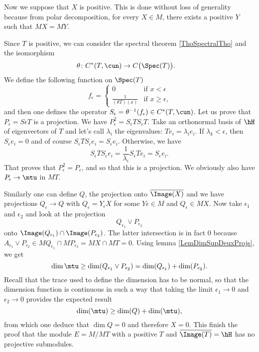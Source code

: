 Now we suppose that $X$ is positive. This is done without loss of generality because from polar decomposition, for every $X\in M$, there exists a positive $Y$ such that $MX=MY$.

Since $T$ is positive, we can consider the spectral theorem \ref{ThoSpectralTho} and the isomorphism
\begin{equation}
\begin{aligned}
 \theta\colon C^*(T,\cun)&\to C\big( \Spec(T) \big). 
\end{aligned}
\end{equation}
We define the following function on $\Spec(T)$
\begin{equation}
	f_{\epsilon}=
			\begin{cases}
					0				&\text{if $x<\epsilon$}\\
					\frac{ 1 }{ (\theta T)(x) }	&\text{if $x\geq\epsilon$,}
			\end{cases}
\end{equation}
and then one defines the operator $S_{\epsilon}=\theta^{-1}(f_{\epsilon})\in C^*(T,\cun)$. Let us prove that $P_{\epsilon}=S\epsilon T$ is a projection. We have $P_{\epsilon}^2=S_{\epsilon} TS_{\epsilon}T$. Take an orthonormal basis of $\hH$ of eigenvectors of $T$ and let's call $\lambda_i$ the eigenvalues: $Te_i=\lambda_ie_i$. If $\lambda_k<\epsilon$, then $S_{\epsilon}e_i=0$ and of course $S_{\epsilon}TS_{\epsilon}e_i=S_{\epsilon}e_i$. Otherwise, we have
\begin{equation}
	S_{\epsilon}TS_{\epsilon}e_i=\frac{1}{ \lambda_i }S_{\epsilon}T e_i =S_{\epsilon}e_i.
\end{equation}
That proves that $P_{\epsilon}^2=P_{\epsilon}$, and so that this is a projection. We obviously also have $P_{\epsilon}\to \mtu$ in $MT$.

Similarly one can define $Q$, the projection onto $\overline{ \Image(X) }$ and we have projections $Q_{\epsilon}\to Q$ with $Q_{\epsilon}=Y_{\epsilon} X$ for some $Y\epsilon\in M$ and $Q_{\epsilon}\in MX$. Now take $\epsilon_1$ and $\epsilon_2$ and look at the projection
\begin{equation}
	Q_{\epsilon_1}\vee P_{\epsilon_2}
\end{equation}
onto $\Image(Q_{\epsilon_1})\cap\Image(P_{\epsilon_2})$. The latter intersection is in fact $0$ because $A_{\epsilon_1}\vee P_{\epsilon_2}\in MQ_{\epsilon_1}\cap MP_{\epsilon_2}=MX\cap MT=0$. Using lemma \ref{LemDimSupDeuxProjs}, we get
\begin{equation}
	\dim\mtu\geq \dim(Q_{\epsilon_1}\vee P_{\epsilon_2})=\dim(Q_{\epsilon_1})+\dim(P_{\epsilon_2}).
\end{equation}
Recall that the trace used to define the dimension has to be normal, so that the dimension function is continuous in such a way that taking the limit $\epsilon_1\to 0$ and $\epsilon_2\to 0$ provides the expected result
\begin{equation}
	\dim(\mtu)\geq \dim(Q)+\dim(\mtu),
\end{equation}
from which one deduce that $\dim Q=0$ and therefore $X=0$. This finish the proof that the module $E=M/MT$ with a positive $T$ and $\overline{ \Image(T) }=\hH$ has no projective submodules.

